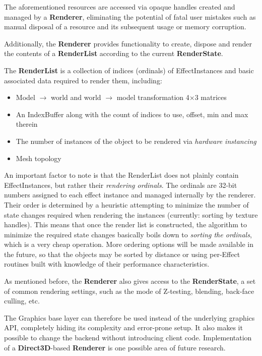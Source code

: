 The aforementioned resources are accessed via opaque handles created and managed by a \textbf{Renderer}, eliminating the potential of fatal user mistakes such as manual disposal of a resource and its subsequent usage or memory corruption.

Additionally, the \textbf{Renderer} provides functionality to create, dispose and render the contents of a \textbf{RenderList} according to the current \textbf{RenderState}.

The \textbf{RenderList} is a collection of indices (ordinals) of EffectInstances and basic associated data required to render them, including:
	
\begin{itemize}
\item Model $\rightarrow$ world and world $\rightarrow$ model transformation 4×3 matrices
\item An IndexBuffer along with the count of indices to use, offset, min and max therein
\item The number of instances of the object to be rendered via \emph{hardware instancing}
\item Mesh topology
\end{itemize}

An important factor to note is that the RenderList does not plainly contain EffectInstances, but rather their \emph{rendering ordinals}. The ordinals are 32-bit numbers assigned to each effect instance and managed internally by the renderer. Their order is determined by a heuristic attempting to minimize the number of state changes required when rendering the instances (currently: sorting by texture handles). This means that once the render list is constructed, the algorithm to minimize the required state changes basically boils down to \emph{sorting the ordinals}, which is a very cheap operation. More ordering options will be made available in the future, so that the objects may be sorted by distance or using per-Effect routines built with knowledge of their performance characteristics.

As mentioned before, the \textbf{Renderer} also gives access to the \textbf{RenderState}, a set of common rendering settings, such as the mode of Z-testing, blending, back-face culling, etc.

The Graphics base layer can therefore be used instead of the underlying graphics API, completely hiding its complexity and error-prone setup. It also makes it possible to change the backend without introducing client code. Implementation of a \textbf{Direct3D}-based \textbf{Renderer} is one possible area of future research.
	
